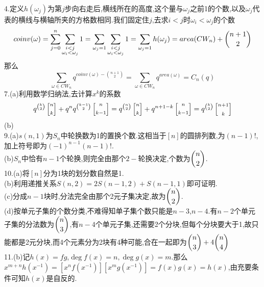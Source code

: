 \documentclass[b5paper]{ctexart}
\newcommand{\qa}[2]{\left[ \substack{#1\vspace{6pt}\\#2}\right]}
\begin{document}
\pagestyle{plain}
\noindent
\\
4.定义$h(\omega_j)$为第$j$步向右走后,横线所在的高度,这个量与$\omega_j$之前1的个数,以及$\omega_j$代表的横线与横轴所夹的方格数相同.我们固定住$j$,去求$i<j$时$\omega_i<\omega_j$的个数
\[coinv(\omega)=\sum_{j=0}^n\sum_{\substack{i<j\\
\omega_i<\omega_j}}1=\sum_{\omega_j=1}\sum_{\substack{i<j\\
\omega_i<\omega_j}}1=\sum_{\omega_j=1}h(\omega_j)=area(CW_n)+\dbinom{n+1}{2}\]
那么
\[\sum_{\omega\in CW_n}q^{coinv(\omega)-\binom{n+1}{2}}=\sum_{\omega\in CW_n}q^{area(\omega)}=C_n(q)\]
7.(a)利用数学归纳法,去计算$x^k$的系数
\[q^{\binom{k}{2}}\qa{n}{k} +q^nq^{\binom{k-1}{2}}\qa{n}{k-1}=q^{\binom{n}{2}}\qa{n}{k} +q^{n+1-k}\qa{n}{k-1}=q^{\binom{k}{2}}\qa{n+1}{k}\]
(b)\\
9.(a)$s(n,1)$为$S_n$中轮换数为1的置换个数.这相当于$[n]$的圆排列数,为$(n-1)!$,加上符号即为$(-1)^{n-1}(n-1)!$.\\
(b)$S_n$中恰有$n-1$个轮换,则完全由那个$2-$轮换决定,个数为$\dbinom{n}{2}$.\\
10.(a)将$[n]$分为1块的划分数自然是1.\\
(b)利用递推关系$S(n,2)=2S(n-1,2)+S(n-1,1)$即可证明.\\
(c)分成$n-1$块时,分法完全由那个2元子集决定,故为$\dbinom{n}{2}$.\\
(d)按单元子集的个数分类,不难得知单子集个数只能是$n-3$,$n-4$.有$n-2$个单元子集的分法数为$\dbinom{n}{3}$,有$n-4$个单元子集,还需要2个分块,但每个分块要大于1,故只能都是2元分块,而4个元素分为2块有4种可能,合在一起即为$\dbinom{n}{3}+4\dbinom{n}{4}$\\
11.(b)记$h(x)=fg$,$\deg{f(x)}=n,\deg{g(x)}=m$.那么$x^{m+n}h(x^{-1})=[x^nf(x^{-1})][x^mg(x^{-1})]=f(x)g(x)=h(x)$,由充要条件可知$h(x)$是自反的.
\end{document}
